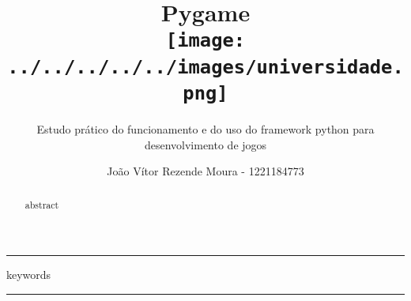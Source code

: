 \documentclass[12pt, a4paper]{paper}
\title{Pygame\\
  \hfill\texttt{[image: ../../../../../images/universidade.png]}
  \vspace{-3cm}
}
\subtitle{Estudo prático do funcionamento e do uso do framework \newline 
          python para desenvolvimento de jogos}
\author{João Vítor Rezende Moura - 1221184773}
\begin{document}
\maketitle

\hrule
\begin{abstract}
  abstract
\end{abstract}
\vspace{-0.6cm} %
\begin{keywords}
  keywords
\end{keywords}
\hrule
\end{document}
